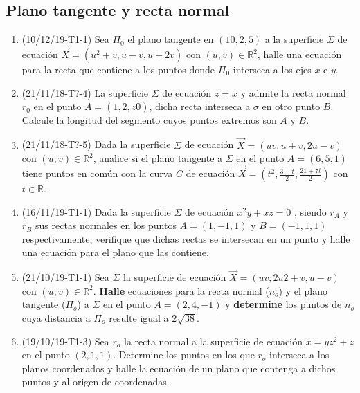 \documentclass[12pt,a4paper]{article}
\renewcommand{\b}[1]{\textbf{#1}}
\newcommand{\R}{\mathbb{R}}
\begin{document}
\subsection{Plano tangente y recta normal}
\begin{enumerate}
	\item (10/12/19-T1-1) Sea $\Pi_0$ el plano tangente en $( 10 , 2 , 5 )$ a la superficie $\Sigma$ de ecuación $\vec{X}= ( u^2 + v , u - v , u + 2 v )$ con $( u , v ) \in \R^2$, halle una ecuación para la recta que contiene a los puntos donde $\Pi_0$ interseca a los ejes $x$ e $y$.
	
	\item (21/11/18-T?-4) La superficie $ \Sigma $ de ecuación $  z = x  $ y admite la recta normal $ r_0  $ en el punto $ A = ( 1 , 2 , z 0 ) $, dicha recta interseca a $ \sigma $ en otro punto $ B $. Calcule la longitud del segmento cuyos puntos extremos son $ A $ y $ B $.
	
	\item (21/11/18-T?-5) Dada la superficie $ \Sigma $ de ecuación $ \vec{X} = ( u v , u + v , 2 u - v ) $ con $ ( u , v )\in\R^2$, analice si el plano tangente a $ \Sigma $ en el punto $ A = ( 6 , 5 , 1 ) $ tiene puntos en común con la curva $ C $ de ecuación $\vec{X}=\left(t^2, \frac{3 - t}{2}, \frac{21 + 7 t}{2} \right)$ con $ t \in\R $.
	
	\item (16/11/19-T1-1) Dada la superficie $ \Sigma $ de ecuación $ x^2 y + x z = 0 $ , siendo $ r_A $ y $ r_B $ sus rectas normales en los puntos $ A = ( 1 , - 1 , 1 ) $ y $ B = (- 1 , 1 , 1 ) $ respectivamente, verifique que dichas rectas se intersecan en un punto y halle una ecuación para el plano que las contiene.
	
	\item (21/10/19-T1-1) Sea $ \Sigma $ la superficie de ecuación $ \vec{X} = ( u v , 2 u 2 + v , u - v ) $ con $( u , v )\in\R^2 $. \b{Halle} ecuaciones para la recta normal ($n_o$) y el plano tangente ($\Pi_o$) a $ \Sigma $ en el punto $ A = ( 2 , 4 , - 1 ) $ y \b{determine} los puntos de	$ n_o $ cuya distancia a $ \Pi_o $ resulte igual a $ 2 \sqrt{38}  $.
	
	\item (19/10/19-T1-3) Sea $ r_o $ la recta normal a la superficie de ecuación $ x = y z^2 + z $ en el punto $ ( 2 , 1 , 1 )  $. Determine los puntos en los que $ r_o $ interseca a los planos coordenados y halle la ecuación de un plano que contenga a dichos puntos y al origen de coordenadas.
	

\end{enumerate}
\end{document}

